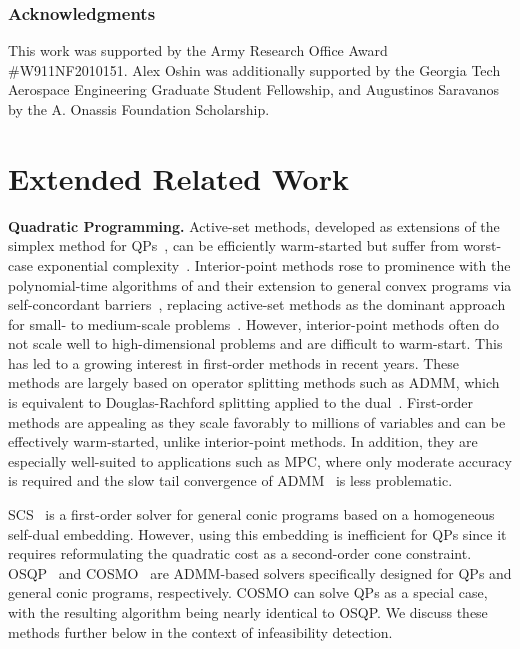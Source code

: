 \documentclass{article} %
\begin{document}
\subsubsection*{Acknowledgments}
This work was supported by the Army Research Office Award \#W911NF2010151.
Alex Oshin was additionally supported by the Georgia Tech Aerospace Engineering Graduate Student Fellowship, and Augustinos Saravanos by the A. Onassis Foundation Scholarship.




\newpage
\appendix

\section{Extended Related Work}
\label{appendix:extended_related_work}

\textbf{Quadratic Programming.}
Active-set methods, developed as extensions of the simplex method for QPs~\citep{Wolfe1959Simplex}, can be efficiently warm-started but suffer from worst-case exponential complexity~\citep{Klee1970How}.
Interior-point methods rose to prominence with the polynomial-time algorithms of \citet{Karmarkar1984Polynomial} and their extension to general convex programs via self-concordant barriers~\citep{Nesterov1994Interior}, replacing active-set methods as the dominant approach for small- to medium-scale problems~\citep{Wright2004Interior}.
However, interior-point methods often do not scale well to high-dimensional problems and are difficult to warm-start.
This has led to a growing interest in first-order methods in recent years.
These methods are largely based on operator splitting methods such as ADMM, which is equivalent to Douglas-Rachford splitting applied to the dual~\citep{Gabay1983Augmented}.
First-order methods are appealing as they scale favorably to millions of variables and can be effectively warm-started, unlike interior-point methods.
In addition, they are especially well-suited to applications such as MPC, where only moderate accuracy is required and the slow tail convergence of ADMM~\citep{He2012Convergence} is less problematic.

SCS~\citep{odonoghue2016conic} is a first-order solver for general conic programs based on a homogeneous self-dual embedding.
However, using this embedding is inefficient for QPs since it requires reformulating the quadratic cost as a second-order cone constraint.
OSQP~\citep{stellato2020osqp} and COSMO~\citep{garstka2021cosmo} are ADMM-based solvers specifically designed for QPs and general conic programs, respectively.
COSMO can solve QPs as a special case, with the resulting algorithm being nearly identical to OSQP.
We discuss these methods further below in the context of infeasibility detection.
\end{document}

